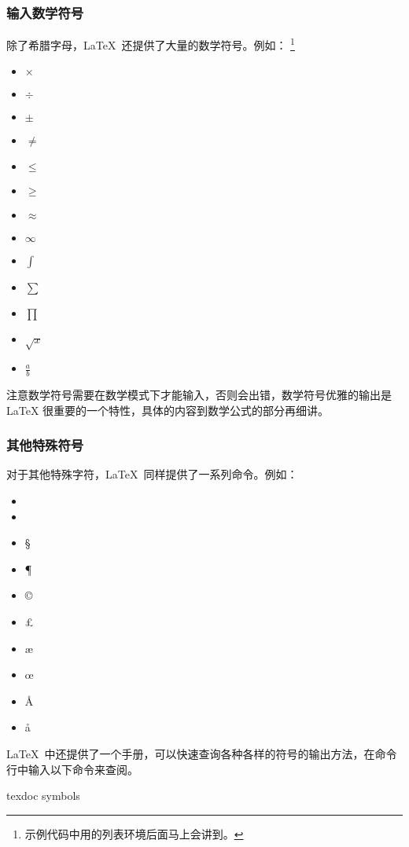{\subsubsection{输入数学符号}
除了希腊字母，\LaTeX\ 还提供了大量的数学符号。例如：
\footnote{示例代码中用的列表环境后面马上会讲到。}
\begin{texlst}
\begin{itemize}[nosep]
	\item $\times$
	\item $\div$
	\item $\pm$
	\item $\neq$
	\item $\leq$
	\item $\geq$
	\item $\approx$
	\item $\infty$
	\item $\int$
	\item $\sum$
	\item $\prod$
	\item $\sqrt{x}$
	\item $\frac{a}{b}$
\end{itemize}
\end{texlst}
注意数学符号需要在数学模式下才能输入，否则会出错，数学符号优雅的输出是\LaTeX
很重要的一个特性，具体的内容到数学公式的部分再细讲。
\vfill
\pagebreak
\subsubsection{其他特殊符号}
对于其他特殊字符，\LaTeX\ 同样提供了一系列命令。例如：

\begin{texlst}
\begin{itemize}[nosep]
	\item \dag
	\item \ddag
	\item \S
	\item \P
	\item \copyright
	\item \pounds
	\item \ae
	\item \oe
	\item \AA
	\item \aa
\end{itemize}
\end{texlst}

\LaTeX\ 中还提供了一个手册，可以快速查询各种各样的符号的输出方法，在命令行中输入以下命令来查阅。
\begin{shellcmd}
	texdoc symbols
\end{shellcmd}

}
